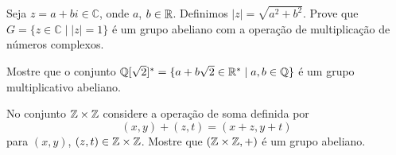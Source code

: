 \documentclass[12pt]{exam}
\begin{document}
\vspace{.3cm}

\questao{} Seja $z  = a + bi \in \mathbb{C}$, onde $a$, $b \in \mathbb{R}$. Definimos $|z| = \sqrt{a^2 + b^2}$. Prove que $G=\{z \in \mathbb{C} \mid |z| = 1\}$ {\'e} um grupo
abeliano com a opera{\c c}{\~a}o de multiplica{\c c}{\~a}o de n{\'u}meros complexos.

\vspace{.3cm}

\questao{} Mostre que o conjunto $\mathbb{Q}[\sqrt{2}]^*=\{ a + b\sqrt{2} \in
\mathbb{R}^* \mid  a, b \in \mathbb{Q} \}$ {\'e} um grupo multiplicativo abeliano.

\vspace{.3cm}

\questao{} No conjunto $\mathbb{Z} \times \mathbb{Z}$ considere a opera\c{c}\~ao de soma definida por
\[
	(x, y) + (z, t) = (x + z, y + t)
\]
para $(x, y)$, $(z, t) \in \mathbb{Z} \times \mathbb{Z}$. Mostre que $(\mathbb{Z}\times\mathbb{Z}, +)$ \'e um grupo abeliano.





\end{document}
